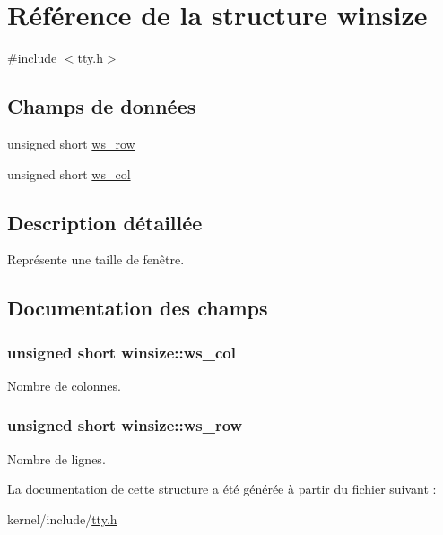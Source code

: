 \hypertarget{structwinsize}{\section{Référence de la structure winsize}
\label{structwinsize}
}


{\ttfamily \#include $<$tty.\-h$>$}

\subsection*{Champs de données}
\begin{DoxyCompactItemize}
\item 
unsigned short \hyperlink{structwinsize_a73698fa1d966374b0701e4bf225f0141}{ws\-\_\-row}
\item 
unsigned short \hyperlink{structwinsize_a80bedf71a49fd324e0d92d0702cc7005}{ws\-\_\-col}
\end{DoxyCompactItemize}


\subsection{Description détaillée}
Représente une taille de fenêtre. 

\subsection{Documentation des champs}
\hypertarget{structwinsize_a80bedf71a49fd324e0d92d0702cc7005}{
\subsubsection[{ws\-\_\-col}]{\setlength{\rightskip}{0pt plus 5cm}unsigned short winsize\-::ws\-\_\-col}}\label{structwinsize_a80bedf71a49fd324e0d92d0702cc7005}
Nombre de colonnes. \hypertarget{structwinsize_a73698fa1d966374b0701e4bf225f0141}{
\subsubsection[{ws\-\_\-row}]{\setlength{\rightskip}{0pt plus 5cm}unsigned short winsize\-::ws\-\_\-row}}\label{structwinsize_a73698fa1d966374b0701e4bf225f0141}
Nombre de lignes. 

La documentation de cette structure a été générée à partir du fichier suivant \-:\begin{DoxyCompactItemize}
\item 
kernel/include/\hyperlink{tty_8h}{tty.\-h}\end{DoxyCompactItemize}
